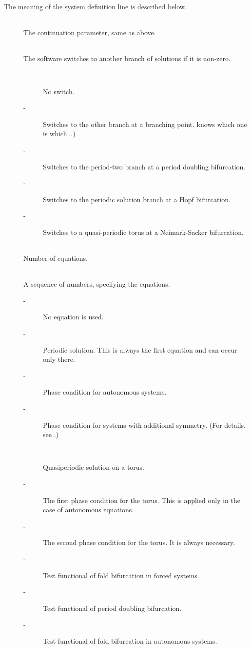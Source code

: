\documentclass[10pt,a4paper]{ddedoc}
\begin{document}
The meaning of the system definition line is described below.
\begin{description}
\item[] ~\\
	The continuation parameter, same as above.
%
\item[] ~\\
	The software switches to another branch of solutions if it is non-zero.
\begin{description}
\item[ -] No switch.
\item[ -] Switches to the other branch at a branching point. %
knows which one is which...)
\item[ -] Switches to the period-two branch at a period doubling
bifurcation.
\item[ -] Switches to the periodic solution branch at a Hopf
bifurcation.
\item[ -] Switches to a quasi-periodic torus at a Neimark-Sacker
bifurcation.
\end{description}
\item[] ~\\
	Number of equations.
\item[] ~\\
	A sequence of numbers, specifying the equations.
\begin{description}
\item[ -] No equation is used.
\item[ -] Periodic solution. This is always the first equation and can
occur only there.
\item[ -] Phase condition for autonomous systems.
\item[ -] Phase condition for systems with additional symmetry. (For
details, see \cite{haegeman}.)
\item[ -] Quasiperiodic solution on a torus.
\item[ -] The first phase condition for the torus. This is applied
only in the case of autonomous equations.
\item[ -] The second phase condition for the torus. It is always
necessary.
\item[ -] Test functional of fold bifurcation in forced systems.
\item[ -] Test functional of period doubling bifurcation.
\item[ -] Test functional of fold bifurcation in autonomous systems.

\end{description}
\end{description}
\end{document}
